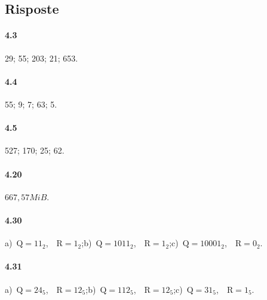 \subsection{Risposte}

\paragraph{4.3} 29; 55; 203; 21; 653.

\paragraph{4.4} 55; 9; 7; 63; 5.

\paragraph{4.5} 527; 170; 25; 62.

\paragraph{4.20} $667,57\unit{MiB}$.

\paragraph{4.30}
a)~$\text{Q}=11_2$,~~$\text{R}=1_2$;\quad b)~$\text{Q}=1011_2$,~~$\text{R}=1_2$;\quad c)~$\text{Q}=10001_2$,~~$\text{R}=0_2$.

\paragraph{4.31}
a)~$\text{Q}=24_5$,~~$\text{R}=12_5$;\quad b)~$\text{Q}=112_5$,~~$\text{R}=12_5$;\quad c)~$\text{Q}=31_5$,~~$\text{R}=1_5$.
